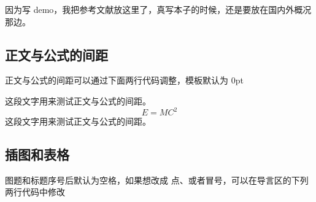 \documentclass[a4paper,cs4size]{article}
\begin{document}
%     
%     

因为写 demo，我把参考文献放这里了，真写本子的时候，还是要放在国内外概况那边。

\begin{spacing}{1.3} %
   \songti   
  
    
  \vspace{11bp}
\end{spacing}

\subsection{正文与公式的间距}
正文与公式的间距可以通过下面两行代码调整，模板默认为 0pt

\setlength{\abovedisplayskip}{0pt}
\setlength{\belowdisplayskip}{0pt}

这段文字用来测试正文与公式的间距。
\begin{equation}
E = MC^2
\end{equation}
这段文字用来测试正文与公式的间距。

\subsection{插图和表格}
图题和标题序号后默认为空格，如果想改成 点、或者冒号，可以在导言区的下列两行代码中修改
\end{document}
